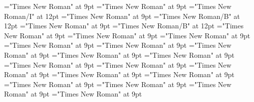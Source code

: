 \documentclass[gps1,twoside]{article}
\begin{document}
\font\ownertypeabbreviationlexsensereferencelexsensereferencessensesensesentrybefore="Times New Roman" at 9pt
\font\spanownertypeabbreviationlexsensereferencelexsensereferencessensesensesentrylastchildafter="Times New Roman" at 9pt
\font\spanownertypeabbreviationlexsensereferencelexsensereferencessensesensesentry="Times New Roman/I" at 12pt
\font\configtargetconfigtargetconfigtargetslexsensereferencelexsensereferencessensesensesentrybefore="Times New Roman" at 9pt
\font\spanbzhheadwordconfigtargetconfigtargetslexsensereferencelexsensereferencessensesensesentry="Times New Roman/B" at 12pt
\font\headwordconfigtargetconfigtargetslexsensereferencelexsensereferencessensesensesentrybefore="Times New Roman" at 9pt
\font\spanheadwordconfigtargetconfigtargetslexsensereferencelexsensereferencessensesensesentry="Times New Roman/B" at 12pt
\font\variantformentrybackrefvariantformentrybackrefvariantformentrybackrefssensesensesentrybefore="Times New Roman" at 9pt
\font\variantformentrybackrefssensesensesentrybefore="Times New Roman" at 9pt
\font\variantformentrybackrefssensesensesentryafter="Times New Roman" at 9pt
\font\variantentrytypevariantentrytypevariantentrytypesvariantformentrybackrefvariantformentrybackrefssensesensesentrybefore="Times New Roman" at 9pt
\font\variantentrytypesvariantformentrybackrefvariantformentrybackrefssensesensesentryafter="Times New Roman" at 9pt
\font\reverseabbrvariantentrytypevariantentrytypesvariantformentrybackrefvariantformentrybackrefssensesensesentrybefore="Times New Roman" at 9pt
\font\spanreverseabbrvariantentrytypevariantentrytypesvariantformentrybackrefvariantformentrybackrefssensesensesentrylastchildafter="Times New Roman" at 9pt
\font\headwordvariantformentrybackrefvariantformentrybackrefssensesensesentrybefore="Times New Roman" at 9pt
\font\owningentrysummarydefinitionvariantformentrybackrefvariantformentrybackrefssensesensesentrybefore="Times New Roman" at 9pt
\font\spanowningentrysummarydefinitionvariantformentrybackrefvariantformentrybackrefssensesensesentrylastchildafter="Times New Roman" at 9pt
\font\scientificnamesensesensesentryafter="Times New Roman" at 9pt
\font\semanticdomainsemanticdomainsemanticdomainssensesensesentrybefore="Times New Roman" at 9pt
\font\semanticdomainssensesensesentrybefore="Times New Roman" at 9pt
\font\semanticdomainssensesensesentryafter="Times New Roman" at 9pt
\font\abbreviationsemanticdomainsemanticdomainssensesensesentrybefore="Times New Roman" at 9pt
\font\spanabbreviationsemanticdomainsemanticdomainssensesensesentrylastchildafter="Times New Roman" at 9pt
\font\namesemanticdomainsemanticdomainssensesensesentrybefore="Times New Roman" at 9pt
\end{document}

